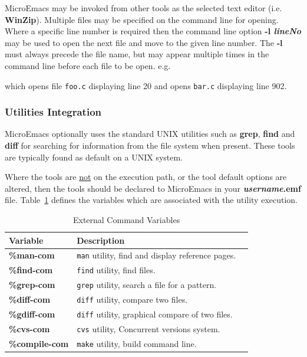 \documentclass[11pt,a4paper,pdftex]{article}
\begin{document}
  MicroEmacs may be invoked from other tools as the selected text editor (i.e.
  \textbf{WinZip}). Multiple files may be specified on the command line for
  opening. Where a specific line number is required then the command line
  option \textbf{-l \textit{lineNo}} may be used to open the next file and
  move to the given line number. The \textbf{-l} must always precede the file
  name, but may appear multiple times in the command line before  each file
  to be open. e.g.


  which opens file \texttt{foo.c} displaying line 20 and opens \texttt{bar.c}
  displaying line 902.

\subsubsection{Utilities Integration}

  MicroEmacs optionally uses the standard UNIX utilities such as
  \textbf{grep}, \textbf{find} and \textbf{diff} for searching for information
  from the file system when present. These tools are typically found as
  default on a UNIX system.

  Where the tools are \underline{not} on the execution path, or the tool
  default options are altered, then the tools should be declared to MicroEmacs
  in your \textbf{\textit{username}.emf} file. Table~\ref{tab:com} defines
  the variables which are associated with the utility execution.

  \begin{table}[ht]
   \begin{center}
    \begin{tabular}{lll}
    \textbf{Variable} & \textbf{Description} \\ \hline
    \textbf{\%man-com} & \texttt{man} utility, find and display reference pages.\\
    \textbf{\%find-com} & \texttt{find} utility, find files.\\
    \textbf{\%grep-com} & \texttt{grep} utility, search a file for a pattern.\\
    \textbf{\%diff-com} & \texttt{diff} utility, compare two files.\\
    \textbf{\%gdiff-com} & \texttt{diff} utility, graphical compare of two files.\\
    \textbf{\%cvs-com} & \texttt{cvs} utility, Concurrent versions system.\\
    \textbf{\%compile-com} & \texttt{make} utility, build command line. \\ \hline
    \end{tabular}
    \caption{External Command Variables}
    \label{tab:com}
   \end{center}
  \end{table}
\end{document}
